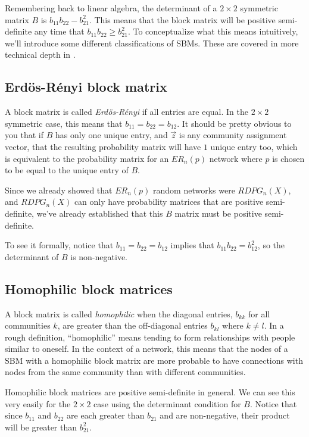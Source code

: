 Remembering back to linear algebra, the determinant of a $2 \times 2$ symmetric matrix $B$ is $b_{11}b_{22} - b_{21}^2$. This means that the block matrix will be positive semi-definite any time that $b_{11}b_{22} \geq b_{21}^2$. To conceptualize what this means intuitively, we'll introduce some different classifications of SBMs. These are covered in more technical depth in \cite{Chung2021Mar}.

\subsection{Erd\"os-R\'enyi block matrix}

A block matrix is called \textit{Erd\"os-R\'enyi} if all entries are equal. In the $2 \times 2$ symmetric case, this means that $b_{11} = b_{22} = b_{12}$. It should be pretty obvious to you that if $B$ has only one unique entry, and $\vec z$ is any community assignment vector, that the resulting probability matrix will have $1$ unique entry too, which is equivalent to the probability matrix for an $ER_n(p)$ network where $p$ is chosen to be equal to the unique entry of $B$. 

Since we already showed that $ER_n(p)$ random networks were $RDPG_n(X)$, and $RDPG_n(X)$ can only have probability matrices that are positive semi-definite, we've already established that this $B$ matrix must be positive semi-definite. 

To see it formally, notice that $b_{11} = b_{22} = b_{12}$ implies that $b_{11}b_{22} = b_{12}^2$, so the determinant of $B$ is non-negative.

\subsection{Homophilic block matrices}
\label{sec:ch5:psd_block:homophily}

A block matrix is called \textit{homophilic} when the diagonal entries, $b_{kk}$ for all communities $k$, are greater than the off-diagonal entries $b_{kl}$ where $k \neq l$. In a rough definition, ``homophilic'' means tending to form relationships with people similar to oneself. In the context of a network, this means that the nodes of a SBM with a homophilic block matrix are more probable to have connections with nodes from the same community than with different communities.

Homophilic block matrices are positive semi-definite in general. We can see this very easily for the $2 \times 2$ case using the determinant condition for $B$. Notice that since $b_{11}$ and $b_{22}$ are each greater than $b_{21}$ and are non-negative, their product will be greater than $b_{21}^2$. 

